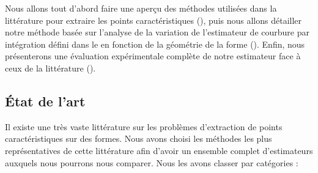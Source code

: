 %
%
%
%
%


Nous allons tout d'abord faire une aperçu des méthodes utilisées dans la
littérature pour extraire les points caractéristiques
(), puis nous allons détailler notre
méthode basée sur l'analyse de la variation de l'estimateur de courbure par
intégration défini dans le  en fonction de la
géométrie de la forme (). Enfin, nous
présenterons une évaluation expérimentale complète de notre estimateur face à
ceux de la littérature ().
%
\subsection{État de l'art}%
\label{sec:applications:feature:SOTA}
%
Il existe une très vaste littérature sur les problèmes d'extraction de points
caractéristiques sur des formes. Nous avons choisi les méthodes les plus
représentatives de cette littérature afin d'avoir un ensemble complet
d'estimateurs auxquels nous pourrons nous comparer. Nous les avons classer par
catégories :
%
%
